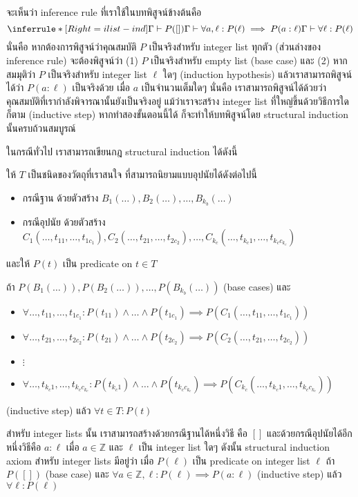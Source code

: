 จะเห็นว่า inference rule ที่เราใช้ในบทพิสูจน์ข้างต้นคือ
\[
\inferrule*[Right=ilist-ind]
{\Gamma\vdash P([]) \\ \Gamma\vdash\forall a,\ell:P(\ell)\implies P(a:\ell)}
{\Gamma\vdash\forall \ell: P(\ell)}
\]
นั่นคือ หากต้องการพิสูจน์ว่าคุณสมบัติ $P$ เป็นจริงสำหรับ integer list ทุกตัว (ส่วนล่างของ inference rule) จะต้องพิสูจน์ว่า (1) $P$ เป็นจริงสำหรับ empty list (base case) และ (2) หากสมมุติว่า $P$ เป็นจริงสำหรับ integer list $\ell$ ใดๆ (induction hypothesis) แล้วเราสามารถพิสูจน์ได้ว่า $P(a:\ell)$ เป็นจริงด้วย เมื่อ $a$ เป็นจำนวนเต็มใดๆ นั่นคือ เราสามารถพิสูจน์ได้ด้วยว่าคุณสมบัติที่เรากำลังพิจารณานั้นยังเป็นจริงอยู่ แม้ว่าเราจะสร้าง integer list ที่ใหญ่ขึ้นด้วยวิธีการใดก็ตาม (inductive step) \enskip หากทำสองขั้นตอนนี้ได้ ก็จะทำให้บทพิสูจน์โดย structural induction นั้นครบถ้วนสมบูรณ์

ในกรณีทั่วไป เราสามารถเขียนกฎ structural induction ได้ดังนี้
\begin{axiom}
ให้ $T$ เป็นชนิดของวัตถุที่เราสนใจ ที่สามารถนิยามแบบอุปนัยได้ดังต่อไปนี้
\begin{itemize}
\item กรณีฐาน ด้วยตัวสร้าง $B_1(\ldots),B_2(\ldots),\ldots,B_{k_b}(\ldots)$
\item กรณีอุปนัย ด้วยตัวสร้าง $C_1(\ldots,t_{11},\ldots,t_{1{c_1}}),C_2(\ldots,t_{21},\ldots,t_{2{c_2}}),\ldots,C_{k_c}(\ldots,t_{{k_c}1},\ldots,t_{{k_c}{c_{k_c}}})$
\end{itemize}
และให้ $P(t)$ เป็น predicate on $t\in T$

ถ้า $P(B_1(\ldots)),P(B_2(\ldots)),\ldots,P(B_{k_b}(\ldots))$ (base cases) และ
\begin{itemize}
\item $\forall \ldots,t_{11},\ldots,t_{1c_1}: P(t_{11})\wedge\ldots\wedge P(t_{1c_1})\implies P(C_1(\ldots,t_{11},\ldots,t_{1{c_1}}))$
\item $\forall \ldots,t_{21},\ldots,t_{2c_2}: P(t_{21})\wedge\ldots\wedge P(t_{2c_2})\implies P(C_2(\ldots,t_{21},\ldots,t_{2{c_2}}))$
\item $\vdots$
\item $\forall \ldots,t_{{k_c}1},\ldots,t_{{k_c}c_{k_c}}: P(t_{{k_c}1})\wedge\ldots\wedge P(t_{{k_c}c_{k_c}})\implies P(C_{k_c}(\ldots,t_{{k_c}1},\ldots,t_{{k_c}{c_{k_c}}}))$
\end{itemize}
(inductive step) แล้ว $\forall t\in T: P(t)$
\end{axiom}
\begin{example}
สำหรับ integer lists นั้น เราสามารถสร้างด้วยกรณีฐานได้หนึ่งวิธี คือ $[]$ และด้วยกรณีอุปนัยได้อีกหนึ่งวิธีคือ $a:\ell$ เมื่อ $a\in\mathbb{Z}$ และ $\ell$ เป็น integer list ใดๆ \enskip ดังนั้น structural induction axiom สำหรับ integer lists มีอยู่ว่า เมื่อ $P(\ell)$ เป็น predicate on integer list $\ell$ ถ้า $P([])$ (base case) และ $\forall a\in\mathbb{Z},\ell: P(\ell)\implies P(a:\ell)$ (inductive step) แล้ว $\forall\ell: P(\ell)$
\end{example}

